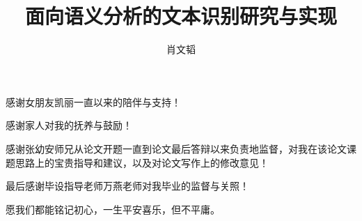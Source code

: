 \documentclass[project, fontset=windows, openany, oneside, submit]{sjtuthesis}
\begin{document}
\title{面向语义分析的文本识别研究与实现}
\author{肖文韬}


\maketitle
\mainmatter
\pagestyle{main}

\tableofcontents


\begin{finish}


\backmatter %
\printbibliography[heading=bibintoc]

\begin{thanks}

感谢女朋友凯丽一直以来的陪伴与支持！

感谢家人对我的抚养与鼓励！

感谢张幼安师兄从论文开题一直到论文最后答辩以来负责地监督，对我在该论文课题思路上的宝贵指导和建议，以及对论文写作上的修改意见！

最后感谢毕设指导老师万燕老师对我毕业的监督与关照！

愿我们都能铭记初心，一生平安喜乐，但不平庸。

\end{thanks}

\end{finish}
\end{document}
